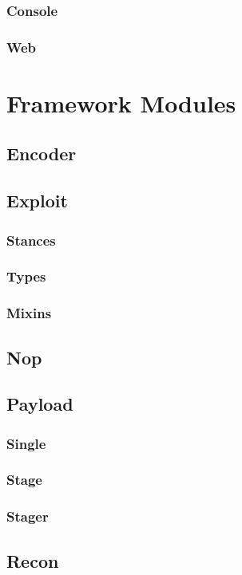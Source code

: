 \documentclass{report}
\begin{document}
        \subsection{Console}
        \subsection{Web}
\chapter{Framework Modules}
\label{framework-modules}

    \section{Encoder}
    \section{Exploit}
        \subsection{Stances}
        \subsection{Types}
        \subsection{Mixins}
    \section{Nop}
    \section{Payload}
        \subsection{Single}
        \subsection{Stage}
        \subsection{Stager}
    \section{Recon}
\end{document}
